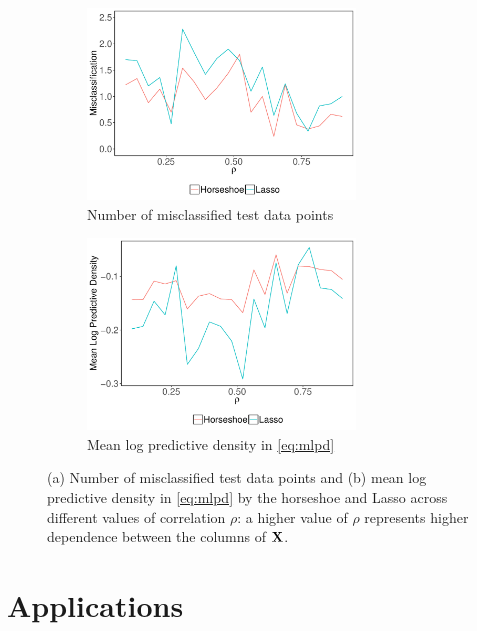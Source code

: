 \documentclass[sts,preprint]{imsart}
\begin{document}
\begin{figure}[t!]%
\begin{subfigure}[t]{0.45\linewidth}%
\includegraphics[height=2in,width=\columnwidth]{mp_hs_lasso_20_100_2_ideal_pars}%
\caption{Number of misclassified test data points}%
\label{fig:4a}%
\end{subfigure}
\begin{subfigure}[t]{0.45\linewidth}%
\includegraphics[height=2in,width=\columnwidth]{mlpd_hs_lasso_20_100_2_ideal_pars}%
\caption{Mean log predictive density in \eqref{eq:mlpd}}%
\label{fig:4b}%
\end{subfigure}
\caption{(a) Number of misclassified test data points and (b) mean log predictive
density in \eqref{eq:mlpd} by the horseshoe and Lasso across different values of correlation
$\rho$: a higher value of $\rho$ represents higher dependence between the columns of ${\bf X}$.}%
\label{fig:logistic}%
\end{figure}

\section{Applications}\label{sec:app-ext}

\end{document}
